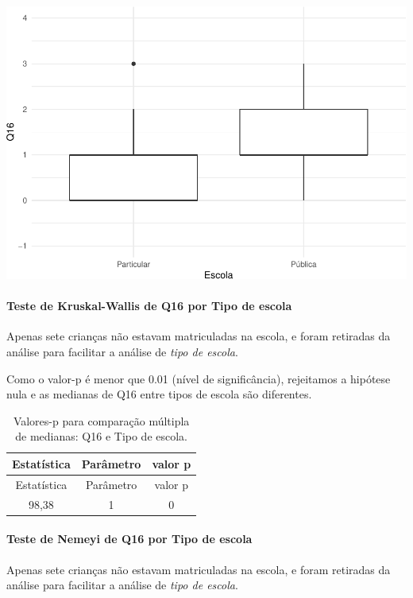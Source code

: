 \documentclass[]{article}
\let\oldparagraph\paragraph
\renewcommand{\paragraph}[1]{\oldparagraph{#1}\mbox{}}
\begin{document}
\begin{center}\includegraphics[width=0.75\linewidth]{relatorio_covid19_files/figure-latex/unnamed-chunk-176-1} \end{center}

\hypertarget{teste-de-kruskal-wallis-de-q16-por-tipo-de-escola}{%
\paragraph{Teste de Kruskal-Wallis de Q16 por Tipo de escola}\label{teste-de-kruskal-wallis-de-q16-por-tipo-de-escola}}

Apenas sete crianças não estavam matriculadas na escola, e foram retiradas da análise para facilitar a análise de \emph{tipo de escola}.

Como o valor-p é menor que 0.01 (nível de significância), rejeitamos a hipótese nula e as medianas de Q16 entre tipos de escola são diferentes.

\begin{longtable}[]{@{}ccc@{}}
\caption{\label{tab:unnamed-chunk-178}Valores-p para comparação múltipla de medianas: Q16 e Tipo de escola.}\tabularnewline
\toprule
Estatística & Parâmetro & valor p\tabularnewline
\midrule
\endfirsthead
\toprule
Estatística & Parâmetro & valor p\tabularnewline
\midrule
\endhead
98,38 & 1 & 0\tabularnewline
\bottomrule
\end{longtable}

\hypertarget{teste-de-nemeyi-de-q16-por-tipo-de-escola}{%
\paragraph{Teste de Nemeyi de Q16 por Tipo de escola}\label{teste-de-nemeyi-de-q16-por-tipo-de-escola}}

Apenas sete crianças não estavam matriculadas na escola, e foram retiradas da análise para facilitar a análise de \emph{tipo de escola}.
\end{document}
